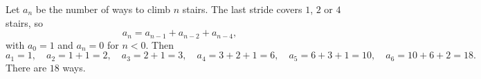 Let $a_n$ be the number of ways to climb $n$ stairs. The last stride covers $1$, $2$ or $4$ stairs, so
\[a_n=a_{n-1}+a_{n-2}+a_{n-4},\]
with $a_0=1$ and $a_n=0$ for $n<0$. Then
\[a_1=1,\quad a_2=1+1=2,\quad a_3=2+1=3,\quad a_4=3+2+1=6,\quad a_5=6+3+1=10,\quad a_6=10+6+2=18.\]
There are $\boxed{18}$ ways.
